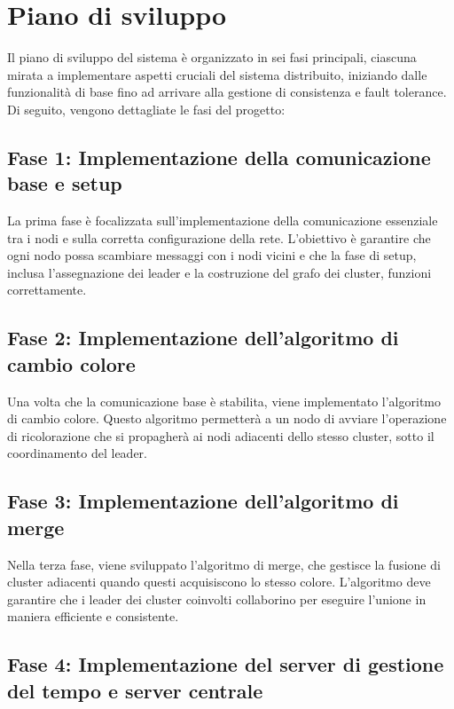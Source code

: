 \documentclass[12pt, a4paper]{report}
\begin{document}
\section{Piano di sviluppo}

Il piano di sviluppo del sistema \`e organizzato in sei fasi principali, ciascuna mirata a implementare aspetti cruciali del sistema distribuito, iniziando dalle funzionalit\`a di base fino ad arrivare alla gestione di consistenza e fault tolerance. Di seguito, vengono dettagliate le fasi del progetto:

\subsection*{Fase 1: Implementazione della comunicazione base e setup}

La prima fase \`e focalizzata sull'implementazione della comunicazione essenziale tra i nodi e sulla corretta configurazione della rete. L'obiettivo \`e garantire che ogni nodo possa scambiare messaggi con i nodi vicini e che la fase di setup, inclusa l'assegnazione dei leader e la costruzione del grafo dei cluster, funzioni correttamente.

\subsection*{Fase 2: Implementazione dell'algoritmo di cambio colore}

Una volta che la comunicazione base \`e stabilita, viene implementato l'algoritmo di cambio colore. Questo algoritmo permetter\`a a un nodo di avviare l'operazione di ricolorazione che si propagher\`a ai nodi adiacenti dello stesso cluster, sotto il coordinamento del leader.

\subsection*{Fase 3: Implementazione dell'algoritmo di merge}

Nella terza fase, viene sviluppato l'algoritmo di merge, che gestisce la fusione di cluster adiacenti quando questi acquisiscono lo stesso colore. L'algoritmo deve garantire che i leader dei cluster coinvolti collaborino per eseguire l'unione in maniera efficiente e consistente.

\subsection*{Fase 4: Implementazione del server di gestione del tempo e server centrale}
\end{document}
